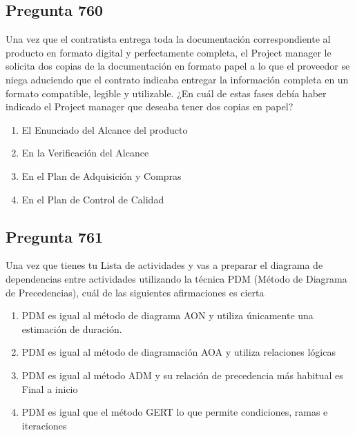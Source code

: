 \documentclass[11pt,a4paper]{article}
\begin{document}
\subsection*{Pregunta 760}
Una vez que el contratista entrega toda la documentación correspondiente al producto en formato digital y perfectamente completa, el Project manager le solicita dos copias de la documentación en formato papel a lo que el proveedor se niega aduciendo que el contrato indicaba entregar la información completa en un formato compatible, legible y utilizable. ¿En cuál de estas fases debía haber indicado el Project manager que deseaba tener dos copias en papel?

\begin{enumerate}[label=\alph*)]
  \item El Enunciado del Alcance del producto
  \item En la Verificación del Alcance
  \item En el Plan de Adquisición y Compras
  \item En el Plan de Control de Calidad
\end{enumerate}

\subsection*{Pregunta 761}
Una vez que tienes tu Lista de actividades y vas a preparar el diagrama de dependencias entre actividades utilizando la técnica PDM (Método de Diagrama de Precedencias), cuál de las siguientes afirmaciones es cierta

\begin{enumerate}[label=\alph*)]
  \item PDM es igual al método de diagrama AON y utiliza únicamente una estimación de duración.
  \item PDM es igual al método de diagramación AOA y utiliza relaciones lógicas
  \item PDM es igual al método ADM y su relación de precedencia más habitual es Final a inicio
  \item PDM es igual que el método GERT lo que permite condiciones, ramas e iteraciones
\end{enumerate}
\end{document}
